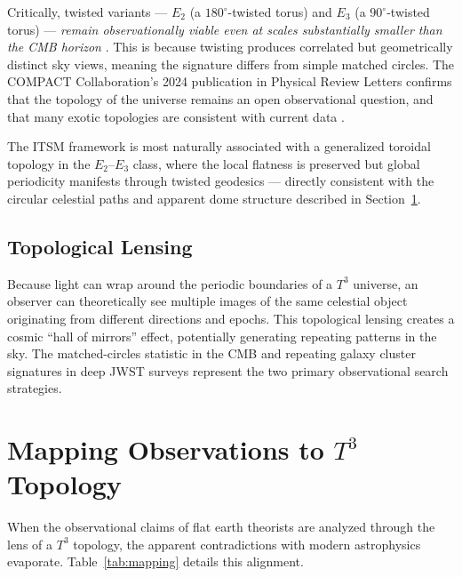 \documentclass[aps,prd,11pt,onecolumn,superscriptaddress,nofootinbib,floatfix]{revtex4-2}
\begin{document}
Critically, twisted variants --- $E_2$ (a $180^{\circ}$-twisted torus) and $E_3$ (a $90^{\circ}$-twisted torus) --- \emph{remain observationally viable even at scales substantially smaller than the CMB horizon} \cite{compact_promise}. This is because twisting produces correlated but geometrically distinct sky views, meaning the signature differs from simple matched circles. The COMPACT Collaboration's 2024 publication in Physical Review Letters confirms that the topology of the universe remains an open observational question, and that many exotic topologies are consistent with current data \cite{compact_promise}.

The ITSM framework is most naturally associated with a generalized toroidal topology in the $E_2$--$E_3$ class, where the local flatness is preserved but global periodicity manifests through twisted geodesics --- directly consistent with the circular celestial paths and apparent dome structure described in Section~\ref{sec:mapping}.

\subsection{Topological Lensing}
Because light can wrap around the periodic boundaries of a $T^3$ universe, an observer can theoretically see multiple images of the same celestial object originating from different directions and epochs. This topological lensing creates a cosmic ``hall of mirrors'' effect, potentially generating repeating patterns in the sky. The matched-circles statistic in the CMB \cite{compact_pt1} and repeating galaxy cluster signatures in deep JWST surveys represent the two primary observational search strategies.

\section{Mapping Observations to $T^3$ Topology}
\label{sec:mapping}

When the observational claims of flat earth theorists are analyzed through the lens of a $T^3$ topology, the apparent contradictions with modern astrophysics evaporate. Table~\ref{tab:mapping} details this alignment.
\end{document}

